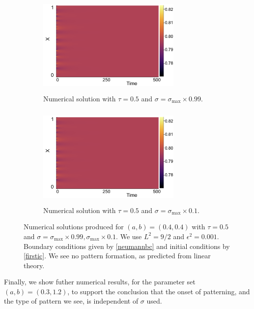 \begin{figure}[H]
    \centering
    \begin{subfigure}[t]{0.45\textwidth}
        \centering
        \includegraphics[width=7cm,height=5cm]{linapp2.png}
        \caption{Numerical solution with $\tau=0.5$ and $\sigma=\sigma_{\max}\times0.99$.}
        \label{}
    \end{subfigure}
    \hfill
    \begin{subfigure}[t]{0.45\textwidth}
        \centering
        \includegraphics[width=7cm,height=5cm]{linapp2.png}
        \caption{Numerical solution with $\tau=0.5$ and $\sigma=\sigma_{\max}\times0.1$.}
        \label{}
    \end{subfigure}
    \caption{Numerical solutions produced for $(a,b)=(0.4,0.4)$ with $\tau=0.5$ and $\sigma=\sigma_{\max}\times0.99, \sigma_{\max}\times0.1$. We use $L^2=9/2$ and $\epsilon^2=0.001$. Boundary conditions given by \eqref{neumannbc} and initial conditions by \eqref{firstic}. We see no pattern formation, as predicted from linear theory.}
    \label{fig:linapp2}
\end{figure}

Finally, we show futher numerical results, for the parameter set $(a,b)=(0.3,1.2)$, to support the conclusion that the onset of patterning, and the type of pattern we see, is independent of $\sigma$ used.

